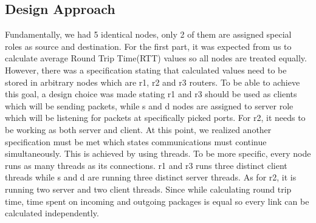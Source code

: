 \documentclass[conference]{IEEEtran}
\begin{document}
\subsection{Design Approach}
Fundamentally, we had 5 identical nodes, only 2 of them are assigned special roles as source and destination. For the first part, it was expected from us to calculate average Round Trip Time(RTT) values so all nodes are treated equally. However, there was a specification stating that calculated values need to be stored in arbitrary nodes which are r1, r2 and r3 routers. To be able to achieve this goal, a design choice was made stating r1 and r3 should be used as clients which will be sending packets, while s and d nodes are assigned to server role which will be listening for packets at specifically picked ports. For r2, it needs to be working as both server and client. At this point, we realized another specification must be met which states communications must continue simultaneously. This is achieved by using threads. To be more specific, every node runs as many threads as its connections. r1 and r3 runs three distinct client threads while s and d are running three distinct server threads. As for r2, it is running two server and two client threads. Since while calculating round trip time, time spent on incoming and outgoing packages is equal so every link can be calculated independently. 
\end{document}
